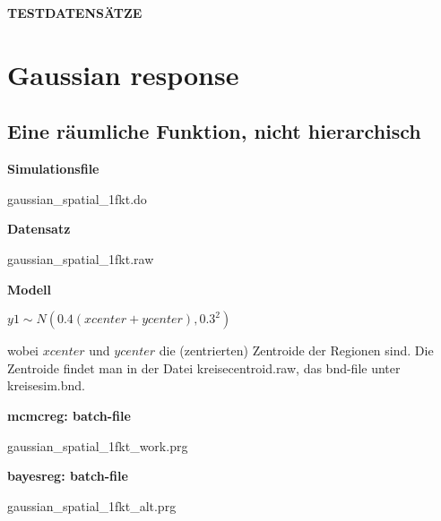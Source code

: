 \documentclass[10pt,a4paper]{article}
\begin{document}
{\bf \Huge TESTDATENS\"{A}TZE}

\tableofcontents

\section{Gaussian response}

\subsection{Eine r\"{a}umliche Funktion, nicht hierarchisch}

{\bf Simulationsfile}

gaussian\_spatial\_1fkt.do

{\bf Datensatz}

gaussian\_spatial\_1fkt.raw

{\bf Modell}

$y1  \sim N(0.4(xcenter+ycenter),0.3^2)$

wobei $xcenter$ und $ycenter$ die (zentrierten) Zentroide der
Regionen sind. Die Zentroide findet man in der Datei
kreisecentroid.raw, das bnd-file unter kreisesim.bnd.

{\bf mcmcreg: batch-file}

gaussian\_spatial\_1fkt\_work.prg

{\bf bayesreg: batch-file}

gaussian\_spatial\_1fkt\_alt.prg
\end{document}

